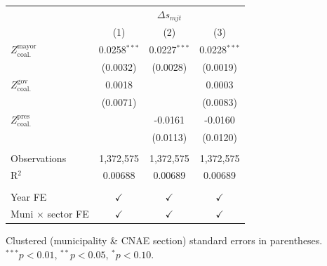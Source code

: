 \begingroup
\centering
\begin{tabular}{lccc}
   \toprule
    & \multicolumn{3}{c}{$\Delta s_{mjt}$}\\
                                       & (1)            & (2)            & (3)\\  
   \midrule 
   $Z^{\text{mayor}}_{\text{coal.}}$   & 0.0258$^{***}$ & 0.0227$^{***}$ & 0.0228$^{***}$\\   
                                       & (0.0032)       & (0.0028)       & (0.0019)\\   
   $Z^{\text{gov}}_{\text{coal.}}$     & 0.0018         &                & 0.0003\\   
                                       & (0.0071)       &                & (0.0083)\\   
   $Z^{\text{pres}}_{\text{coal.}}$    &                & -0.0161        & -0.0160\\   
                                       &                & (0.0113)       & (0.0120)\\   
    \\
   Observations                        & 1,372,575      & 1,372,575      & 1,372,575\\  
   R$^2$                               & 0.00688        & 0.00689        & 0.00689\\  
    \\
   Year FE                             & $\checkmark$   & $\checkmark$   & $\checkmark$\\   
   Muni $\times$ sector FE             & $\checkmark$   & $\checkmark$   & $\checkmark$\\   
   \bottomrule
\end{tabular}
 
\par \raggedright 
Clustered (municipality \& CNAE section) standard errors in parentheses. $^{***}p<0.01$, $^{**}p<0.05$, $^{*}p<0.10$.
\par\endgroup
